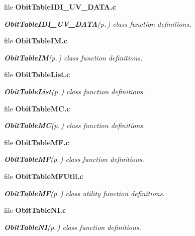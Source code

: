 \begin{CompactItemize}
\item 
file {\bf Obit\-Table\-IDI\_\-UV\_\-DATA.c}
\begin{CompactList}\small\item\em {\bf Obit\-Table\-IDI\_\-UV\_\-DATA}{\rm (p.\,\pageref{structObitTableIDI__UV__DATA})} class function definitions. \item\end{CompactList}

\item 
file {\bf Obit\-Table\-IM.c}
\begin{CompactList}\small\item\em {\bf Obit\-Table\-IM}{\rm (p.\,\pageref{structObitTableIM})} class function definitions. \item\end{CompactList}

\item 
file {\bf Obit\-Table\-List.c}
\begin{CompactList}\small\item\em {\bf Obit\-Table\-List}{\rm (p.\,\pageref{structObitTableList})} class function definitions. \item\end{CompactList}

\item 
file {\bf Obit\-Table\-MC.c}
\begin{CompactList}\small\item\em {\bf Obit\-Table\-MC}{\rm (p.\,\pageref{structObitTableMC})} class function definitions. \item\end{CompactList}

\item 
file {\bf Obit\-Table\-MF.c}
\begin{CompactList}\small\item\em {\bf Obit\-Table\-MF}{\rm (p.\,\pageref{structObitTableMF})} class function definitions. \item\end{CompactList}

\item 
file {\bf Obit\-Table\-MFUtil.c}
\begin{CompactList}\small\item\em {\bf Obit\-Table\-MF}{\rm (p.\,\pageref{structObitTableMF})} class utility function definitions. \item\end{CompactList}

\item 
file {\bf Obit\-Table\-NI.c}
\begin{CompactList}\small\item\em {\bf Obit\-Table\-NI}{\rm (p.\,\pageref{structObitTableNI})} class function definitions. \item\end{CompactList}


\end{CompactItemize}
